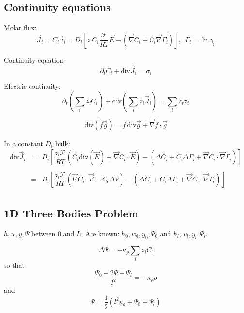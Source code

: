 \documentclass[aps,12pt]{revtex4}
\begin{document}
\subsection{Continuity equations}

Molar flux:
\begin{equation}
	\vec{J}_i = C_i \vec{v}_i = D_i \left[z_i C_i  \dfrac{\mathcal{F}}{RT} \vec{E} - \left(\vec{\nabla} C_i + C_i \vec{\nabla}\Gamma_i\right) \right],\;\;\Gamma_i = \ln \gamma_i
\end{equation}

Continuity equation:
\begin{equation}
	\partial_t C_i + \mathrm{div} \vec{J}_i = \sigma_i
\end{equation}

Electric continuity:
\begin{equation}
	\partial_t \left(\sum_i z_i C_i\right) + \mathrm{div} \left(\sum_i z_i \vec{J}_i\right) = \sum_i z_i \sigma_i
\end{equation}


\begin{equation}
	\mathrm{div}(f\vec{g}) = f \, \mathrm{div}\vec{g} + \vec{\nabla} f \cdot \vec{g}
\end{equation}

In a constant $D_i$ bulk:
\begin{equation}
\begin{array}{rcl}
\mathrm{div} \vec{J}_i & = & D_i \left[ \dfrac{z_i\mathcal{F}}{RT} 
\left(C_i \mathrm{div}\left(\vec{E}\right) + \vec{\nabla} C_i \cdot \vec{E} \right) 
- \left( \Delta C_i + C_i \Delta \Gamma_i + \vec{\nabla} C_i \cdot \vec{\nabla} \Gamma_i \right)
\right]\\
\\
 & = &  D_i \left[ \dfrac{z_i\mathcal{F}}{RT} 
\left(  \vec{\nabla} C_i \cdot \vec{E} - C_i \Delta V \right) 
- \left( \Delta C_i + C_i \Delta \Gamma_i + \vec{\nabla} C_i \cdot \vec{\nabla} \Gamma_i \right)
\right]\\
\end{array}
\end{equation}

\subsection{1D Three Bodies Problem}

$h,w,y,\Psi$ between $0$ and $L$.
Are known: $h_0,w_0,y_0,\Psi_0$ and $h_l,w_l,y_l,\Psi_l$.

\begin{equation}
	\Delta \Psi = -\kappa_\rho \sum_i z_i C_i
\end{equation}
so that
\begin{equation}
	\dfrac{\Psi_0 - 2\Psi + \Psi_l}{l^2} = -\kappa_\rho \rho
\end{equation}
and
\begin{equation}
	\Psi = \dfrac{1}{2} \left( l^2\kappa_\rho + \Psi_0 + \Psi_l \right)
\end{equation}
\end{document}
